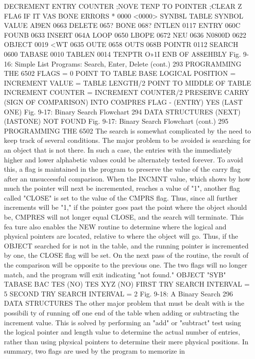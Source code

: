 {{{{{{{{{DECREMENT ENTRY COUNTER
;NOVE TENP TO POINTER
;CLEAR Z FLA6 IF IT VAS BONE
ERRORS * 0000 <0000>
SYNB8L TABLE
SYNBOL VALUE
AI9EN 0663 DELETE 065? BONE 068? fNTLEN 0117
ENTRY 060C FOUNB 0633 INSERT 064A LOOP 0650
LBOPE 0672 NEU 0636 N0800D 0622 OBJECT 0019
<WT 0635 OUTE 0658 OUTS 068B POINTR 0112
SEARCH 0600 TABASE 0010 TABLEN 0014 TENPTR O»1I
ENB OF A88EHBLY
Fig. 9-16: Simple List Programs: Search, Enter, Delete (cont.)
293
PROGRAMMING THE 6502
FLAGS = 0
POINT TO TABLE BASE
LOGICAL POSITION = INCREMENT VALUE
= TABLE LENGTH/2
POINT TO MIDDLE OF TABLE
INCREMENT COUNTER = INCREMENT COUNTER/2
PRESERVE CARRY (SIGN OF COMPARISON)
INTO COMPRES FLAG
- (ENTRY)
YES
(LAST ONE)
Fig. 9-17: Binary Search Flowchart
294
DATA STRUCTURES
(NEXT) (IASTONE)
NOT
FOUND
Fig. 9-17: Binary Search Flowchart (cont.)
295
PROGRAMMING THE 6502
The search is somewhat complicated by the need to keep track of
several conditions. The major problem to be avoided is searching for an
object that is not there. In such a case, the entries with the immediately
higher and lower alphabetic values could be alternately tested forever.
To avoid this, a flag is maintained in the program to preserve the value
of the carry flag after an unsuccessful comparison. When the INCMNT
value, which shows by how much the pointer will next be incremented,
reaches a value of "1", another flag called "CLOSE" is set to the value
of the CMPRS flag. Thus, since all further increments will be "1," if
the pointer goes past the point where the object should be, CMPRES
will not longer equal CLOSE, and the search will terminate. This fea
ture also enables the NEW routine to determine where the logical and
physical pointers are located, relative to where the object will go.
Thus, if the OBJECT searched for is not in the table, and the
running pointer is incremented by one, the CLOSE flag will be set.
On the next pass of the routine, the result of the comparison will be
opposite to the previous one. The two flags will no longer match,
and the program will exit indicating "not found."
OBJECT
"SYB"
TABASE
BAC
TES
(NO)
TES
XYZ
(NO)
FIRST TRY
SEARCH INTERVAL = 5
SECOND TRY
SEARCH INTERVAL = 2
Fig. 9-18: A Binary Search
296
DATA STRUCTURES
The other major problem that must be dealt with is the possibili
ty of running off one end of the table when adding or subtracting
the increment value. This is solved by performing an "add" or
"subtract" test using the logical pointer and length value to determine
the actual number of entries, rather than using physical pointers to
determine their mere physical positions.
In summary, two flags are used by the program to memorize in
}}}}}}}}}
